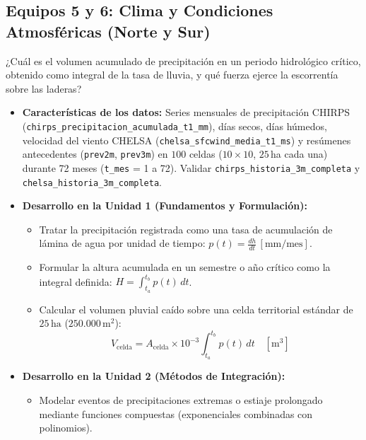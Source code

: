 \documentclass[11pt,a4paper]{article}
\begin{document}
\subsection{Equipos 5 y 6: Clima y Condiciones Atmosféricas (Norte y Sur)}
\begin{guidelinebox}[title=Pregunta Guía Central]
¿Cuál es el volumen acumulado de precipitación en un periodo hidrológico crítico, obtenido como integral de la tasa de lluvia, y qué fuerza ejerce la escorrentía sobre las laderas?
\end{guidelinebox}

\begin{itemize}[leftmargin=*,itemsep=1.5pt]
  \item \textbf{Características de los datos:} Series mensuales de precipitación CHIRPS (\texttt{chirps\_\allowbreak precipitacion\_\allowbreak acumulada\_\allowbreak t1\_mm}), días secos, días húmedos, velocidad del viento CHELSA (\texttt{chelsa\_\allowbreak sfcwind\_\allowbreak media\_\allowbreak t1\_ms}) y resúmenes antecedentes (\texttt{prev2m}, \texttt{prev3m}) en $100$ celdas ($10\times10$, $25$\,ha cada una) durante 72 meses (\texttt{t\_mes} = 1 a 72). Validar \texttt{chirps\_\allowbreak historia\_\allowbreak 3m\_\allowbreak completa} y \texttt{chelsa\_\allowbreak historia\_\allowbreak 3m\_\allowbreak completa}.
  \item \textbf{Desarrollo en la Unidad 1 (Fundamentos y Formulación):}
  \begin{itemize}
    \item Tratar la precipitación registrada como una tasa de acumulación de lámina de agua por unidad de tiempo: $p(t) = \frac{dh}{dt}\,[\text{mm/mes}]$.
    \item Formular la altura acumulada en un semestre o año crítico como la integral definida: $H = \int_{t_a}^{t_b} p(t)\,dt$.
    \item Calcular el volumen pluvial caído sobre una celda territorial estándar de $25\,\text{ha}$ ($250.000\,\text{m}^2$):
    \begin{equation*}
      V_{\text{celda}} = A_{\text{celda}} \times 10^{-3} \int_{t_a}^{t_b} p(t)\,dt \quad [\text{m}^3]
    \end{equation*}
  \end{itemize}
  \item \textbf{Desarrollo en la Unidad 2 (Métodos de Integración):}
  \begin{itemize}
    \item Modelar eventos de precipitaciones extremas o estiaje prolongado mediante funciones compuestas (exponenciales combinadas con polinomios).

\end{itemize}
\end{itemize}
\end{document}
